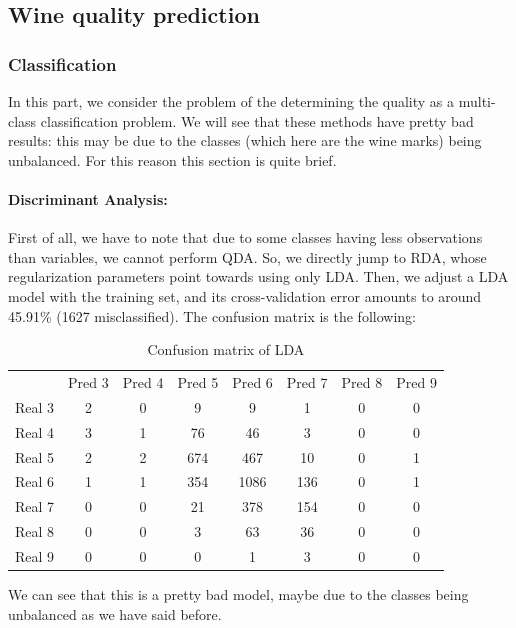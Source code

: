 \documentclass[10pt]{article}
\begin{document}
\subsection{Wine quality prediction}

\subsubsection{Classification}

In this part, we consider the problem of the determining the quality as a multi-class classification problem. We will see that these methods have pretty bad results: this may be due to the classes (which here are the wine marks) being unbalanced. For this reason this section is quite brief.

\paragraph{Discriminant Analysis:} First of all, we have to note that due to some classes having less observations than variables, we cannot perform QDA. So, we directly jump to RDA, whose regularization parameters point towards using only LDA. Then, we adjust a LDA model with the training set, and its cross-validation error amounts to around 45.91\% (1627 misclassified). The confusion matrix is the following:

\begin{table}[H]
\centering
\caption{Confusion matrix of LDA}
\begin{tabular}{cccccccc}
       & Pred 3 & Pred 4 & Pred 5 & Pred 6 & Pred 7 & Pred 8 & Pred 9 \\
Real 3 & 2 & 0 & 9 & 9 & 1 & 0 & 0 \\
Real 4 & 3 & 1 & 76 & 46 & 3 & 0 & 0 \\
Real 5 & 2 & 2 & 674 & 467 & 10 & 0 & 1\\
Real 6 & 1 & 1 & 354 & 1086 & 136 & 0 & 1\\
Real 7 & 0 & 0 & 21 & 378 & 154 & 0 & 0\\
Real 8 & 0 & 0 & 3 & 63 & 36 & 0 & 0\\
Real 9 & 0 & 0 & 0 & 1 & 3 & 0 & 0
\end{tabular}
\end{table}
We can see that this is a pretty bad model, maybe due to the classes being unbalanced as we have said before.
\end{document}
